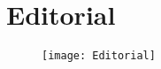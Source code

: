 
\chapter{Editorial}
\begin{figure}[h]
\centering
\centerline{\texttt{[image: Editorial]} }
\end{figure}
